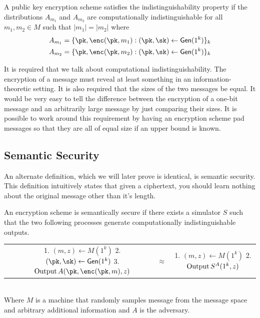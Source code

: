 \documentclass[12pt]{tufte-book}
\begin{document}
\begin{definition}[Indistinguishability]
A public key encryption scheme satisfies the indistinguishability property if
the distributions
$A_{m_1}$ and $A_{m_2}$ are computationally indistinguishable for all $m_1, m_2 \in M$
such that $|m_1| = |m_2|$ where
\begin{align*}
A_{m_1} = \{\pk, \enc(\pk, m_1) : (\pk, \sk) \gets \gen(1^k)\}_k \\
A_{m_2} = \{\pk, \enc(\pk, m_2) : (\pk, \sk) \gets \gen(1^k)\}_k
\end{align*}
\end{definition}

It is required that we talk about computational indistinguishability. The encryption
of a message must reveal at least something in an information-theoretic setting.
It is also required that the sizes of the two messages be equal. It would be very
easy to tell the difference between the encryption of a one-bit message and an
arbitrarily large message by just comparing their sizes. It is possible to work around
this requirement by having an encryption scheme pad messages so that they are all
of equal size if an upper bound is known.



\subsection{Semantic Security}
An alternate definition, which we will later prove is identical, is semantic security.
This definition intuitively states that given a ciphertext, you should learn nothing about
the original message other than it's length.

\begin{definition}
An encryption scheme is semantically secure if there exists
a simulator $S$ such that the two following processes generate computationally
indistinguishable outputs.

\begin{tabular}{cccc}
\parbox[t]{2.5cm}{\noindent \\}
&
\parbox[t]{5.8cm}{
1. $(m,z) \gets M(1^k)$ \\
2. $(\pk, \sk) \gets \gen(1^k)$ \\
3. $\text{Output\,} A(\pk, \enc(\pk, m), z)$
}
&
\parbox[t]{1cm}{
\noindent\\
$\approx$
}
&
\parbox[t]{4.5cm}{
1. $(m,z) \gets M(1^k)$ \\
2. $\text{Output\,} S^A(1^k, z)$
}
\end{tabular}
\\

Where $M$ is a machine that randomly samples message from the message space and
arbitrary additional information and $A$ is the adversary.

\end{definition}
\end{document}
